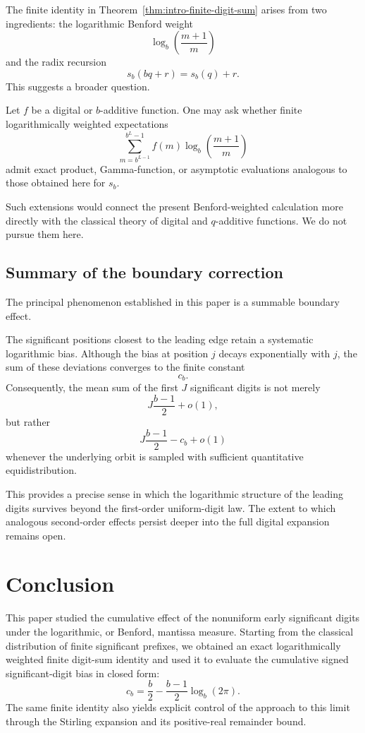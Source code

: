 \documentclass[11pt]{article}
\theoremstyle{definition}
\theoremstyle{remark}
\begin{document}
The finite identity in
Theorem~\ref{thm:intro-finite-digit-sum} arises from two ingredients:
the logarithmic Benford weight
\[
    \log_b\!\left(\frac{m+1}{m}\right)
\]
and the radix recursion
\[
    s_b(bq+r)=s_b(q)+r.
\]
This suggests a broader question.

Let \(f\) be a digital or \(b\)-additive function.  One may ask whether
finite logarithmically weighted expectations
\[
    \sum_{m=b^{L-1}}^{b^L-1}
    f(m)
    \log_b\!\left(\frac{m+1}{m}\right)
\]
admit exact product, Gamma-function, or asymptotic evaluations analogous
to those obtained here for \(s_b\).

Such extensions would connect the present Benford-weighted calculation
more directly with the classical theory of digital and \(q\)-additive
functions.  We do not pursue them here.


\subsection{Summary of the boundary correction}
\label{subsec:boundary-correction-summary}

The principal phenomenon established in this paper is a summable
boundary effect.

The significant positions closest to the leading edge retain a
systematic logarithmic bias. Although the bias at position \(j\)
decays exponentially with \(j\), the sum of these deviations converges
to the finite constant
\[
    c_b.
\]
Consequently, the mean sum of the first \(J\) significant digits is not
merely
\[
    J\frac{b-1}{2}+o(1),
\]
but rather
\[
    J\frac{b-1}{2}-c_b+o(1)
\]
whenever the underlying orbit is sampled with sufficient quantitative
equidistribution.

This provides a precise sense in which the logarithmic structure of
the leading digits survives beyond the first-order uniform-digit law.
The extent to which analogous second-order effects persist deeper into
the full digital expansion remains open.


\section{Conclusion}
\label{sec:conclusion}

This paper studied the cumulative effect of the nonuniform early
significant digits under the logarithmic, or Benford, mantissa measure.
Starting from the classical distribution of finite significant
prefixes, we obtained an exact logarithmically weighted finite
digit-sum identity and used it to evaluate the cumulative signed
significant-digit bias in closed form:
\[
\boxed{
    c_b
    =
    \frac b2
    -
    \frac{b-1}{2}\log_b(2\pi).
}
\]
The same finite identity also yields explicit control of the approach
to this limit through the Stirling expansion and its positive-real
remainder bound.
\end{document}
